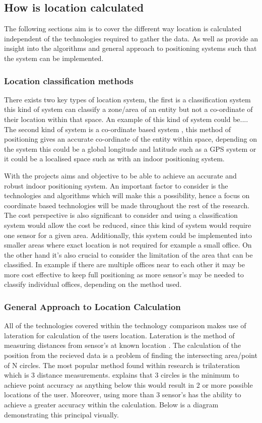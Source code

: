 \subsection{How is location calculated}
The following sections aim is to cover the different way location is calculated independent of the technologies required to gather the data. As well as provide an insight into the algorithms and general approach to positioning systems such that the system can be implemented. 

\subsubsection{Location classification methods}
There exists two key types of location system, the first is a classification system \citetemp this kind of system can classify a zone/area of an entity but not a co-ordinate of their location within that space. An example of this kind of system could be....
The second kind of system is a co-ordinate based system \citetemp, this method of positioning gives an accurate co-ordinate of the entity within space, depending on the system this could be a global longitude and latitude such as a GPS system or it could be a localised space such as with an indoor positioning system.

With the projects aims and objective to be able to achieve an accurate and robust indoor positioning system. An important factor to consider is the technologies and algorithms which will make this a possibility, hence a focus on coordinate based technologies will be made throughout the rest of the research. The cost perspective is also significant to consider and using a classification system would allow the cost be reduced, since this kind of system would require one sensor for a given area. Additionally, this system could be implemented into smaller areas where exact location is not required for example a small office. On the other hand it's also crucial to consider the limitation of the area that can be classified. In example if there are multiple offices near to each other it may be more cost effective to keep full positioning as more sensor's may be needed to classify individual offices, depending on the method used.  

\subsubsection{General Approach to Location Calculation}
All of the technologies covered within the technology comparison makes use of lateration for calculation of the users location. Lateration is the method of measuring distances from sensor's at known location \citetemp. The calculation of the position from the recieved data is a problem of finding the intersecting area/point of N circles. The most popular method found within research is trilateration which is 3 distance measurements. \citetemp explains that 3 circles is the minimum to achieve point accuracy as anything below this would result in 2 or more possible locations of the user. Moreover, using more than 3 sensor's has the ability to achieve a greater accuracy within the calculation. Below is a diagram demonstrating this principal visually.

